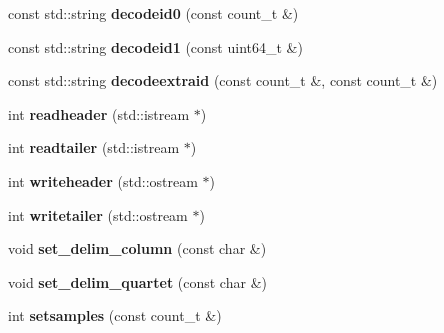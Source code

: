 \begin{DoxyCompactItemize}
\item 
\hypertarget{classprofile__header_a09b249547f4b94702d67f4a7a02a2a20}{const std\-::string {\bfseries decodeid0} (const count\-\_\-t \&)}\label{classprofile__header_a09b249547f4b94702d67f4a7a02a2a20}

\item 
\hypertarget{classprofile__header_af017239b7a58cba90efa1d2196210f7e}{const std\-::string {\bfseries decodeid1} (const uint64\-\_\-t \&)}\label{classprofile__header_af017239b7a58cba90efa1d2196210f7e}

\item 
\hypertarget{classprofile__header_a12fb61349299851354da9c9d53cffbc6}{const std\-::string {\bfseries decodeextraid} (const count\-\_\-t \&, const count\-\_\-t \&)}\label{classprofile__header_a12fb61349299851354da9c9d53cffbc6}

\item 
\hypertarget{classprofile__header_ad9bd955be08aba0c07bad05c03a9fe7b}{int {\bfseries readheader} (std\-::istream $\ast$)}\label{classprofile__header_ad9bd955be08aba0c07bad05c03a9fe7b}

\item 
\hypertarget{classprofile__header_af1e7906989052ab477b0cc6819109ce1}{int {\bfseries readtailer} (std\-::istream $\ast$)}\label{classprofile__header_af1e7906989052ab477b0cc6819109ce1}

\item 
\hypertarget{classprofile__header_aa3cf9f42826a02edaec056d98a12bf55}{int {\bfseries writeheader} (std\-::ostream $\ast$)}\label{classprofile__header_aa3cf9f42826a02edaec056d98a12bf55}

\item 
\hypertarget{classprofile__header_aa723135e0c39d89a5110a099dbf988f3}{int {\bfseries writetailer} (std\-::ostream $\ast$)}\label{classprofile__header_aa723135e0c39d89a5110a099dbf988f3}

\item 
\hypertarget{classprofile__header_a7ab9dc4f50b3633869e666fc19e6a75e}{void {\bfseries set\-\_\-delim\-\_\-column} (const char \&)}\label{classprofile__header_a7ab9dc4f50b3633869e666fc19e6a75e}

\item 
\hypertarget{classprofile__header_ae394520b6c5dee31982ce0930673e34e}{void {\bfseries set\-\_\-delim\-\_\-quartet} (const char \&)}\label{classprofile__header_ae394520b6c5dee31982ce0930673e34e}

\item 
\hypertarget{classprofile__header_aa0316b529c96f14c240807cb1b9027c3}{int {\bfseries setsamples} (const count\-\_\-t \&)}\label{classprofile__header_aa0316b529c96f14c240807cb1b9027c3}


\end{DoxyCompactItemize}
